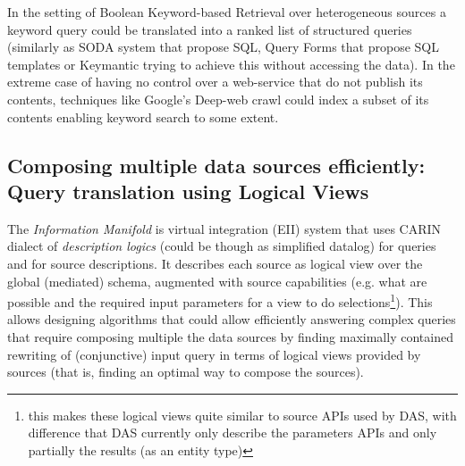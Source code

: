 In the setting of Boolean Keyword-based Retrieval over heterogeneous sources a keyword query could be translated into a ranked list of structured queries (similarly as SODA system that propose SQL, Query Forms that propose SQL templates or Keymantic trying to achieve this without accessing the data).
In the extreme case of having no control over a web-service that do not publish its contents, techniques like Google's Deep-web crawl could index a subset of its contents enabling keyword search to some extent.

\subsection{Composing multiple data sources efficiently: Query translation using Logical Views}
The \textit{Information Manifold}\cite{Levy96} is virtual integration (EII) system that uses CARIN dialect of \textit{description logics} (could be though as simplified datalog) for queries and for source descriptions. It describes each source as logical view over the global (mediated) schema, augmented with source capabilities (e.g. what are possible and the required input parameters for a view to do selections\footnote{this makes these logical views quite similar to source APIs used by DAS, with difference that DAS currently only describe the parameters APIs and only partially the results (as an entity type)}).
%
This allows designing algorithms that could allow efficiently answering complex queries that require composing multiple the data sources by finding maximally contained rewriting of (conjunctive) input query in terms of logical views provided by sources (that is, finding an optimal way to compose the sources).

